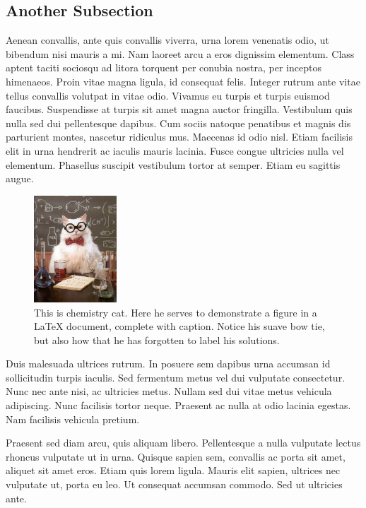 \subsection{Another Subsection}
Aenean convallis, ante quis convallis viverra, urna lorem venenatis odio, ut bibendum nisi mauris a mi. Nam laoreet arcu a eros dignissim elementum. Class aptent taciti sociosqu ad litora torquent per conubia nostra, per inceptos himenaeos. Proin vitae magna ligula, id consequat felis. Integer rutrum ante vitae tellus convallis volutpat in vitae odio. Vivamus eu turpis et turpis euismod faucibus. Suspendisse at turpis sit amet magna auctor fringilla. Vestibulum quis nulla sed dui pellentesque dapibus. Cum sociis natoque penatibus et magnis dis parturient montes, nascetur ridiculus mus. Maecenas id odio nisl. Etiam facilisis elit in urna hendrerit ac iaculis mauris lacinia. Fusce congue ultricies nulla vel elementum. Phasellus suscipit vestibulum tortor at semper. Etiam eu sagittis augue.\cite{gaussian09,bioluminescence,clayden_orgchem}
\begin{figure}
\begin{center}
\includegraphics[height=4cm]{figures/example.jpg}
\caption[Chemistry cat.]{This is chemistry cat. Here he serves to demonstrate a figure in a LaTeX document, complete with caption. Notice his suave bow tie, but also how that he has forgotten to label his solutions.}
\end{center}
\end{figure}
Duis malesuada ultrices rutrum. In posuere sem dapibus urna accumsan id sollicitudin turpis iaculis. Sed fermentum metus vel dui vulputate consectetur. Nunc nec ante nisi, ac ultricies metus. Nullam sed dui vitae metus vehicula adipiscing. Nunc facilisis tortor neque. Praesent ac nulla at odio lacinia egestas. Nam facilisis vehicula pretium.

Praesent sed diam arcu, quis aliquam libero. Pellentesque a nulla vulputate lectus rhoncus vulputate ut in urna. Quisque sapien sem, convallis ac porta sit amet, aliquet sit amet eros. Etiam quis lorem ligula. Mauris elit sapien, ultrices nec vulputate ut, porta eu leo. Ut consequat accumsan commodo. Sed ut ultricies ante.\cite{mithani2012}
